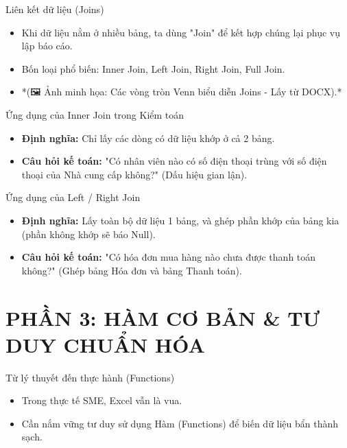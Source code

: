 \documentclass[aspectratio=169]{beamer}
\begin{document}
\begin{frame}{Liên kết dữ liệu (Joins)}
    \begin{itemize}
        \item Khi dữ liệu nằm ở nhiều bảng, ta dùng "Join" để kết hợp chúng lại phục vụ lập báo cáo.
        \item Bốn loại phổ biến: Inner Join, Left Join, Right Join, Full Join.
        \item *(🖼️ Ảnh minh họa: Các vòng tròn Venn biểu diễn Joins - Lấy từ DOCX).*
    \end{itemize}
\end{frame}


\begin{frame}{Ứng dụng của Inner Join trong Kiểm toán}
    \begin{itemize}
        \item \textbf{Định nghĩa:} Chỉ lấy các dòng có dữ liệu khớp ở cả 2 bảng.
        \item \textbf{Câu hỏi kế toán:} "Có nhân viên nào có số điện thoại trùng với số điện thoại của Nhà cung cấp không?" (Dấu hiệu gian lận).
    \end{itemize}
\end{frame}


\begin{frame}{Ứng dụng của Left / Right Join}
    \begin{itemize}
        \item \textbf{Định nghĩa:} Lấy toàn bộ dữ liệu 1 bảng, và ghép phần khớp của bảng kia (phần không khớp sẽ báo Null).
        \item \textbf{Câu hỏi kế toán:} "Có hóa đơn mua hàng nào chưa được thanh toán không?" (Ghép bảng Hóa đơn và bảng Thanh toán).
    \end{itemize}
\end{frame}


\section{PHẦN 3: HÀM CƠ BẢN \& TƯ DUY CHUẨN HÓA}


\begin{frame}{Từ lý thuyết đến thực hành (Functions)}
    \begin{itemize}
        \item Trong thực tế SME, Excel vẫn là vua.
        \item Cần nắm vững tư duy sử dụng Hàm (Functions) để biến dữ liệu bẩn thành sạch.
    \end{itemize}
\end{frame}
\end{document}
